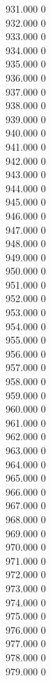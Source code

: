 { 931.000	0 \\
 932.000	0 \\
 933.000	0 \\
 934.000	0 \\
 935.000	0 \\
 936.000	0 \\
 937.000	0 \\
 938.000	0 \\
 939.000	0 \\
 940.000	0 \\
 941.000	0 \\
 942.000	0 \\
 943.000	0 \\
 944.000	0 \\
 945.000	0 \\
 946.000	0 \\
 947.000	0 \\
 948.000	0 \\
 949.000	0 \\
 950.000	0 \\
 951.000	0 \\
 952.000	0 \\
 953.000	0 \\
 954.000	0 \\
 955.000	0 \\
 956.000	0 \\
 957.000	0 \\
 958.000	0 \\
 959.000	0 \\
 960.000	0 \\
 961.000	0 \\
 962.000	0 \\
 963.000	0 \\
 964.000	0 \\
 965.000	0 \\
 966.000	0 \\
 967.000	0 \\
 968.000	0 \\
 969.000	0 \\
 970.000	0 \\
 971.000	0 \\
 972.000	0 \\
 973.000	0 \\
 974.000	0 \\
 975.000	0 \\
 976.000	0 \\
 977.000	0 \\
 978.000	0 \\
 979.000	0 \\
}
